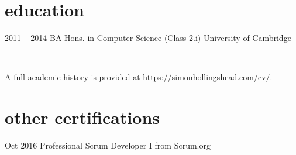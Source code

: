 \documentclass[a4paper]{friggeri-cv} %
\begin{document}
\section{education}

\begin{entrylist}
\entry
{2011 -- 2014}
{BA Hons. {\normalfont in Computer Science (Class }2.i{\normalfont )}}
{University of Cambridge}
{
~

A full academic history is provided at \href{https://simonhollingshead.com/academic-records/}{https://simonhollingshead.com/cv/}.
}
\end{entrylist}

\section{other certifications}
\begin{entrylist}
\entry
{Oct 2016}
{Professional Scrum Developer I}
{from Scrum.org}
{}
\end{entrylist}
\end{document}
